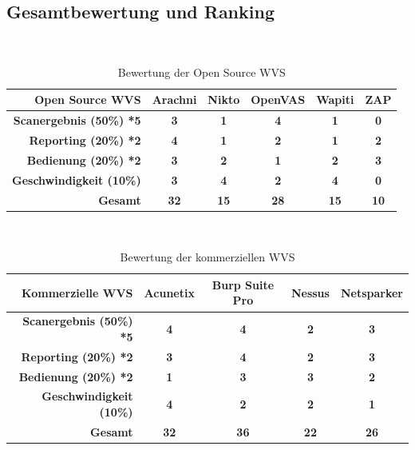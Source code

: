 \documentclass[12pt,oneside,a4paper,parskip]{scrbook}
\begin{document}
     \subsection{Gesamtbewertung und Ranking}
     \ \\
     \begin{table}[H]
       \centering
       \begin{tabular}{|r|c|c|c|c|c|}
       \hline
       \textbf{Open Source WVS}            & \textbf{Arachni} & \textbf{Nikto} & \textbf{OpenVAS} & \textbf{Wapiti} & \textbf{ZAP}  \\
       \hline
       \textbf{Scanergebnis (50\%) *5}    & \textbf{3}      &  \textbf{1}      & \textbf{4}      &   \textbf{1}     &  \textbf{0}       \\
       \hline
       \textbf{Reporting (20\%) *2}       &  \textbf{4}     &  \textbf{1}      & \textbf{2}      &   \textbf{1}    &   \textbf{2}     \\
       \hline
       \textbf{Bedienung (20\%) *2}       & \textbf{3}       & \textbf{2}     & \textbf{1}       & \textbf{2}      & \textbf{3}        \\
       \hline
       \textbf{Geschwindigkeit (10\%)} & \textbf{3}       & \textbf{4}    & \textbf{2}       & \textbf{4}     & \textbf{0}          \\
       \hline
       \textbf{Gesamt}                 &   \textbf{32}     &  \textbf{15}   &  \textbf{28}      &  \textbf{15}    &  \textbf{10}          \\
       \hline
       \end{tabular}
       \caption[Bewertung der Open Source WVS]{Bewertung der Open Source WVS}
     \end{table}
     \ \\
     \begin{table}[H]
       \centering
       \begin{tabular}{|r|c|c|c|c|}
       \hline
       \textbf{Kommerzielle WVS}       & \textbf{Acunetix} & \textbf{Burp Suite Pro} & \textbf{Nessus} & \textbf{Netsparker}  \\
       \hline
       \textbf{Scanergebnis (50\%) *5}    & \textbf{4}      &  \textbf{4}            & \textbf{2}      &   \textbf{3}         \\
       \hline
       \textbf{Reporting (20\%) *2}       &  \textbf{3}     &  \textbf{4}            & \textbf{2}      &   \textbf{3}         \\
       \hline
       \textbf{Bedienung (20\%) *2}       & \textbf{1}      & \textbf{3}           & \textbf{3}      & \textbf{2}        \\
       \hline
       \textbf{Geschwindigkeit (10\%)} & \textbf{4}       & \textbf{2}              & \textbf{2}      & \textbf{1}            \\
       \hline
       \textbf{Gesamt}                 &  \textbf{32}     & \textbf{36}              & \textbf{22}       &  \textbf{26}                    \\
       \hline
       \end{tabular}
       \caption[Bewertung der kommerziellen WVS]{Bewertung der kommerziellen WVS}
     \end{table}
\end{document}
